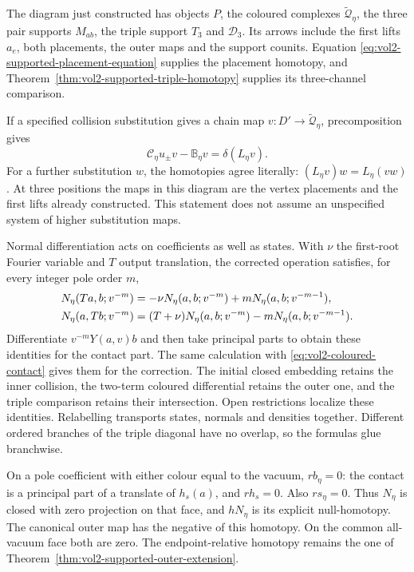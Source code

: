 The diagram just constructed has objects $P$, the coloured
complexes $\widetilde{\mathcal Q}_\eta$, the three pair
supports $M_{ab}$, the triple support $T_3$ and $\mathcal D_3$.
Its arrows include the first lifts $a_e$, both placements,
the outer maps and the support counits. Equation
\eqref{eq:vol2-supported-placement-equation} supplies the
placement homotopy, and
Theorem~\ref{thm:vol2-supported-triple-homotopy} supplies its
three-channel comparison.

If a specified collision substitution gives a chain map
$v:D'\to\widetilde{\mathcal Q}_\eta$, precomposition gives
\[
 \mathcal C_\eta u_\pm v-\mathbb B_\eta v
          =\delta(L_\eta v).
\]
For a further substitution $w$, the homotopies agree
literally: $(L_\eta v)w=L_\eta(vw)$. At three positions the
maps in this diagram are the vertex placements and the first
lifts already constructed. This statement does not assume
an unspecified system of higher substitution maps.

Normal differentiation acts on coefficients as well as
states. With $\nu$ the first-root Fourier variable and $T$
output translation, the corrected operation satisfies, for
every integer pole order $m$,
\begin{align}\label{eq:vol2-outer-normal-relations}
 N_\eta(Ta,b;v^{-m})
   &=-\nu N_\eta(a,b;v^{-m})
                       +mN_\eta(a,b;v^{-m-1}),\notag\\
 N_\eta(a,Tb;v^{-m})
   &=(T+\nu)N_\eta(a,b;v^{-m})
                       -mN_\eta(a,b;v^{-m-1}).
\end{align}
Differentiate $v^{-m}Y(a,v)b$ and then take principal parts
to obtain these identities for the contact part. The same
calculation with \eqref{eq:vol2-coloured-contact} gives them
for the correction. The initial closed embedding retains
the inner collision, the two-term coloured differential
retains the outer one, and the triple comparison retains their
intersection. Open restrictions localize these identities.
Relabelling transports states, normals and densities together.
Different ordered branches of the triple diagonal have no
overlap, so the formulas glue branchwise.

On a pole coefficient with either colour equal to the vacuum,
$rb_\eta=0$: the contact is a principal part of a translate of
$h_s(a)$, and $rh_s=0$. Also $rs_\eta=0$. Thus $N_\eta$
is closed with zero projection on that face, and $hN_\eta$
is its explicit null-homotopy. The canonical outer map has
the negative of this homotopy. On the common all-vacuum face
both are zero. The endpoint-relative homotopy remains the
one of Theorem~\ref{thm:vol2-supported-outer-extension}.

